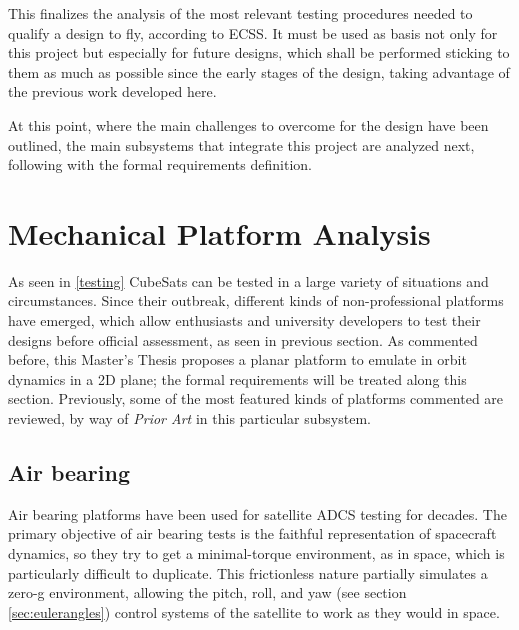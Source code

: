 This finalizes the analysis of the most relevant testing procedures needed to qualify a design to fly, according to \acrshort{ECSS}. It must be used as basis not only for this project but especially for future designs, which shall be performed sticking to them as much as possible since the early stages of the design, taking advantage of the previous work developed here.

At this point, where the main challenges to overcome for the design have been outlined, the main subsystems that integrate this project are analyzed next, following with the formal requirements definition.


\section{Mechanical Platform Analysis} \label{mechplat}

As seen in \autoref{testing} CubeSats can be tested in a large variety of situations and circumstances. Since their outbreak, different kinds of non-professional platforms have emerged, which allow enthusiasts and university developers to test their designs before official assessment,  as seen in previous section. As commented before, this Master's Thesis proposes a planar platform to emulate in orbit dynamics in a 2D plane; the formal requirements will be treated along this section. Previously, some of the most featured kinds of platforms commented are reviewed, by way of \textit{Prior Art} in this particular subsystem.

\subsection{Air bearing}

Air bearing platforms have been used for satellite \acrshort{ADCS} testing for decades. The primary objective of air bearing tests is the faithful representation of spacecraft dynamics, so they try to get a minimal-torque environment, as in space, which is particularly difficult to duplicate.  This frictionless nature partially simulates a zero-g environment, allowing the pitch, roll, and yaw  (see section \ref{sec:eulerangles}) control systems of the satellite to work as they would in space.


